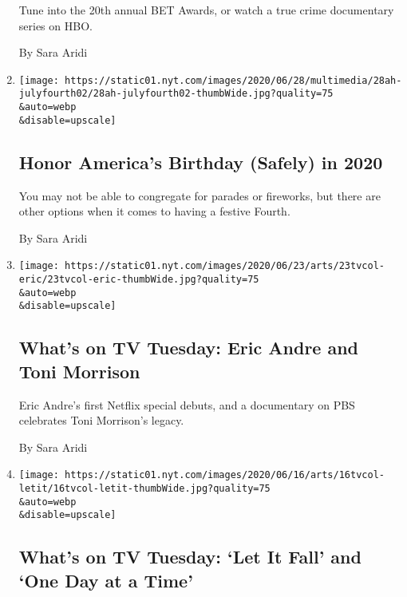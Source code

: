 \begin{enumerate}
  Tune into the 20th annual BET Awards, or watch a true crime
  documentary series on HBO.

  By Sara Aridi
\item
  \href{/2020/06/26/at-home/celebrate-fourth-of-july-coronavirus.html}{}

  \texttt{[image: https://static01.nyt.com/images/2020/06/28/multimedia/28ah-julyfourth02/28ah-julyfourth02-thumbWide.jpg?quality=75\\\&auto=webp\\\&disable=upscale]}

  \hypertarget{honor-americas-birthday-safely-in-2020}{%
  \subsection{Honor America's Birthday (Safely) in
  2020}\label{honor-americas-birthday-safely-in-2020}}

  You may not be able to congregate for parades or fireworks, but there
  are other options when it comes to having a festive Fourth.

  By Sara Aridi
\item
  \href{/2020/06/23/arts/television/whats-on-tv-tuesday-eric-andre-and-toni-morrison.html}{}

  \texttt{[image: https://static01.nyt.com/images/2020/06/23/arts/23tvcol-eric/23tvcol-eric-thumbWide.jpg?quality=75\\\&auto=webp\\\&disable=upscale]}

  \hypertarget{whats-on-tv-tuesday-eric-andre-and-toni-morrison}{%
  \subsection{What's on TV Tuesday: Eric Andre and Toni
  Morrison}\label{whats-on-tv-tuesday-eric-andre-and-toni-morrison}}

  Eric Andre's first Netflix special debuts, and a documentary on PBS
  celebrates Toni Morrison's legacy.

  By Sara Aridi
\item
  \href{/2020/06/16/arts/television/whats-on-tv-tuesday-let-it-fall-and-one-day-at-a-time.html}{}

  \texttt{[image: https://static01.nyt.com/images/2020/06/16/arts/16tvcol-letit/16tvcol-letit-thumbWide.jpg?quality=75\\\&auto=webp\\\&disable=upscale]}

  \hypertarget{whats-on-tv-tuesday-let-it-fall-and-one-day-at-a-time}{%
  \subsection{What's on TV Tuesday: `Let It Fall' and `One Day at a
  Time'}\label{whats-on-tv-tuesday-let-it-fall-and-one-day-at-a-time}}


\end{enumerate}
